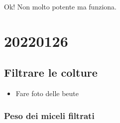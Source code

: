 \documentclass[
]{book}
\providecommand{\tightlist}{%
  \setlength{\itemsep}{0pt}\setlength{\parskip}{0pt}}
\begin{document}
Ok! Non molto potente ma funziona.

\hypertarget{D20220126}{%
\section{20220126}\label{D20220126}}

\hypertarget{filtrare-le-colture}{%
\subsection{Filtrare le colture}\label{filtrare-le-colture}}

\begin{itemize}
\tightlist
\item
  Fare foto delle beute
\end{itemize}

\hypertarget{peso-dei-miceli-filtrati}{%
\subsubsection{Peso dei miceli filtrati}\label{peso-dei-miceli-filtrati}}
\end{document}
